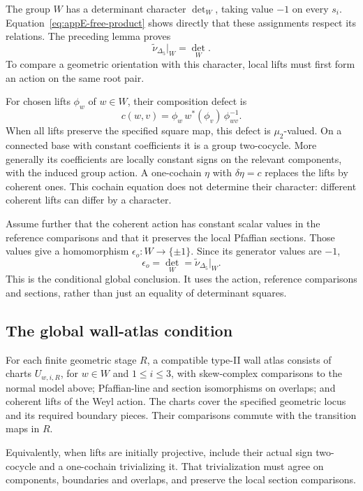 The group \(W\) has a determinant character \(\det_W\), taking
value \(-1\) on every \(s_i\). Equation~\eqref{eq:appE-free-product}
shows directly that these assignments respect its relations.
The preceding lemma proves
\[
 \widetilde\nu_{\Delta_5}|_W=\det_W.
\]
To compare a geometric orientation with this character, local lifts
must first form an action on the same root pair.

For chosen lifts \(\phi_w\) of \(w\in W\), their composition
defect is
\[
 c(w,v)=\phi_w\,w^*(\phi_v)\,\phi_{wv}^{-1}.
\]
When all lifts preserve the specified square map, this defect is
\(\mu_2\)-valued. On a connected base with constant coefficients
it is a group two-cocycle. More generally its coefficients are
locally constant signs on the relevant components, with the induced
group action. A one-cochain \(\eta\) with
\(\delta\eta=c\) replaces the lifts by coherent ones. This
cochain equation does not determine their character: different
coherent lifts can differ by a character.

Assume further that the coherent action has constant scalar values
in the reference comparisons and that it preserves the local
Pfaffian sections. Those values give a homomorphism
\(\epsilon_o:W\to\{\pm1\}\). Since its generator values are
\(-1\),
\[
 \epsilon_o=\det_W=\widetilde\nu_{\Delta_5}|_W.
\]
This is the conditional global conclusion. It uses the action,
reference comparisons and sections, rather than just an equality
of determinant squares.

\subsection{The global wall-atlas condition}
\label{app:pfaffian-wall-O2}

\begin{definition}
\label{def:appE-O2}
For each finite geometric stage \(R\), a compatible type-II wall
atlas consists of charts \(U_{w,i,R}\), for \(w\in W\) and
\(1\le i\le3\), with skew-complex comparisons to the normal model
above; Pfaffian-line and section isomorphisms on overlaps; and
coherent lifts of the Weyl action. The charts cover the specified
geometric locus and its required boundary pieces. Their comparisons
commute with the transition maps in \(R\).

Equivalently, when lifts are initially projective, include their
actual sign two-cocycle and a one-cochain trivializing it. That
trivialization must agree on components, boundaries and overlaps,
and preserve the local section comparisons.
\end{definition}

